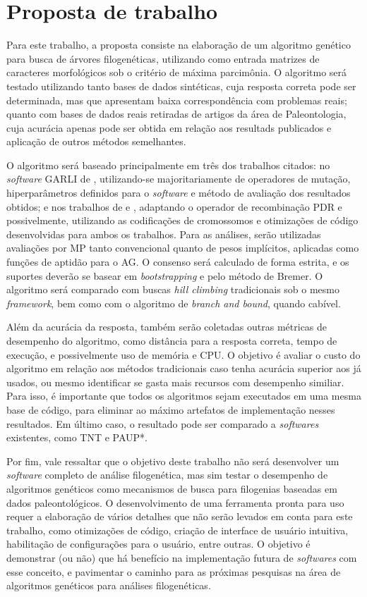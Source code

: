 \documentclass[12pt]{article}
\begin{document}
\section{Proposta de trabalho}

Para este trabalho, a proposta consiste na elaboração de um algoritmo genético para busca de árvores filogenéticas, utilizando como entrada matrizes de caracteres morfológicos sob o critério de máxima parcimônia. O algoritmo será testado utilizando tanto bases de dados sintéticas, cuja resposta correta pode ser determinada, mas que apresentam baixa correspondência com problemas reais; quanto com bases de dados reais retiradas de artigos da área de Paleontologia, cuja acurácia apenas pode ser obtida em relação aos resultads publicados e aplicação de outros métodos semelhantes.

O algoritmo será baseado principalmente em três dos trabalhos citados: no \emph{software} GARLI de \cite{garli}, utilizando-se majoritariamente de operadores de mutação, hiperparâmetros definidos para o \emph{software} e método de avaliação dos resultados obtidos; e nos trabalhos de \cite{cotta2002inferring} e \cite{parsigal}, adaptando o operador de recombinação PDR e possivelmente, utilizando as codificações de cromossomos e otimizações de código desenvolvidas para ambos os trabalhos. Para as análises, serão utilizadas avaliações por MP tanto convencional quanto de pesos implícitos, aplicadas como funções de aptidão para o AG. O consenso será calculado de forma estrita, e os suportes deverão se basear em \emph{bootstrapping} e pelo método de Bremer. O algoritmo será comparado com buscas \emph{hill climbing} tradicionais sob o mesmo \emph{framework}, bem como com o algoritmo de \emph{branch and bound}, quando cabível.

Além da acurácia da resposta, também serão coletadas outras métricas de desempenho do algoritmo, como distância para a resposta correta, tempo de execução, e possivelmente uso de memória e CPU. O objetivo é avaliar o custo do algoritmo em relação aos métodos tradicionais caso tenha acurácia superior aos já usados, ou mesmo identificar se gasta mais recursos com desempenho similiar. Para isso, é importante que todos os algoritmos sejam executados em uma mesma base de código, para eliminar ao máximo artefatos de implementação nesses resultados. Em último caso, o resultado pode ser comparado a \emph{softwares} existentes, como TNT e PAUP*.

Por fim, vale ressaltar que o objetivo deste trabalho não será desenvolver um \emph{software} completo de análise filogenética, mas sim testar o desempenho de algoritmos genéticos como mecanismos de busca para filogenias baseadas em dados paleontológicos. O desenvolvimento de uma ferramenta pronta para uso requer a elaboração de vários detalhes que não serão levados em conta para este trabalho, como otimizações de código, criação de interface de usuário intuitiva, habilitação de configurações para o usuário, entre outras. O objetivo é demonstrar (ou não) que há benefício na implementação futura de \emph{softwares} com esse conceito, e pavimentar o caminho para as próximas pesquisas na área de algoritmos genéticos para análises filogenéticas.
\end{document}
